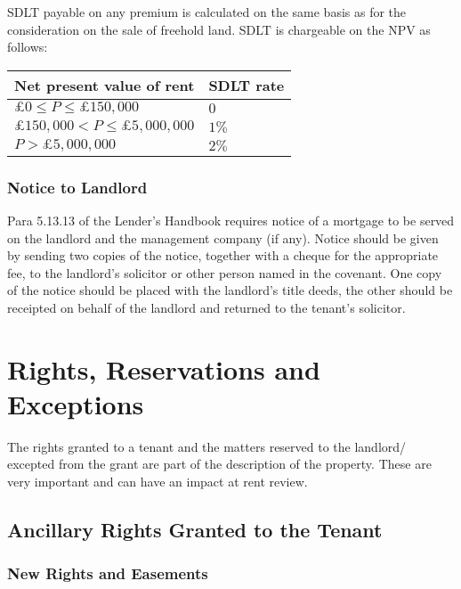 \documentclass[
]{article}
\begin{document}
SDLT payable on any premium is calculated on the same basis as for the
consideration on the sale of freehold land. SDLT is chargeable on the
NPV as follows:

\begin{longtable}[]{@{}ll@{}}
\toprule()
Net present value of rent & SDLT rate \\
\midrule()
\endhead
\(£0 \leq P \leq £150,000\) & \(0\) \\
\(£150,000 < P \leq £5,000,000\) & \(1 \%\) \\
\(P > £5,000,000\) & \(2 \%\) \\
\bottomrule()
\end{longtable}

\hypertarget{notice-to-landlord}{%
\subsubsection{Notice to Landlord}\label{notice-to-landlord}}

Para 5.13.13 of the Lender's Handbook requires notice of a mortgage to
be served on the landlord and the management company (if any). Notice
should be given by sending two copies of the notice, together with a
cheque for the appropriate fee, to the landlord's solicitor or other
person named in the covenant. One copy of the notice should be placed
with the landlord's title deeds, the other should be receipted on behalf
of the landlord and returned to the tenant's solicitor.

\hypertarget{rights-reservations-and-exceptions}{%
\section{Rights, Reservations and
Exceptions}\label{rights-reservations-and-exceptions}}

The rights granted to a tenant and the matters reserved to the landlord/
excepted from the grant are part of the description of the property.
These are very important and can have an impact at rent review.

\hypertarget{ancillary-rights-granted-to-the-tenant}{%
\subsection{Ancillary Rights Granted to the
Tenant}\label{ancillary-rights-granted-to-the-tenant}}

\hypertarget{new-rights-and-easements}{%
\subsubsection{New Rights and
Easements}\label{new-rights-and-easements}}
\end{document}
